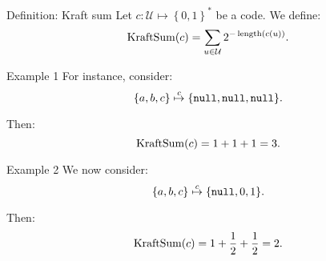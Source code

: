 \documentclass[a4paper]{article}
\begin{document}
\begin{parag}{Definition: Kraft sum}
    Let $c: \mathcal{U} \mapsto \left\{0, 1\right\}^*$ be a code. We define: 
    \[\KraftSum\left(c\right) = \sum_{u \in \mathcal{U}} 2^{-\length\left(c\left(u\right)\right)}.\]

    \begin{subparag}{Example 1}
        For instance, consider: 
        \[\left\{a, b, c\right\} \over{\mapsto}{$c$} \left\{\emptystring, \emptystring, \emptystring\right\}.\]
        
        Then: 
        \[\KraftSum\left(c\right) = 1 + 1 + 1 = 3.\]
    \end{subparag}

    \begin{subparag}{Example 2}
        We now consider:
        \[\left\{a, b, c\right\} \over{\mapsto}{$c$} \left\{\emptystring, 0, 1\right\}.\]
        
        Then: 
        \[\KraftSum\left(c\right) = 1 + \frac{1}{2} + \frac{1}{2} = 2.\]
    \end{subparag}
\end{parag}
\end{document}
